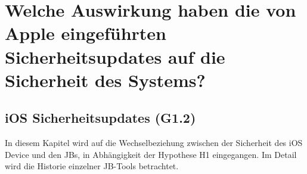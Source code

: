 \section{Welche Auswirkung haben die von Apple eingeführten Sicherheitsupdates auf die Sicherheit des Systems?}
\label{sec:Frage2}
% 

\subsection{iOS Sicherheitsupdates  (G1.2)}
\label{sec:Frage2SecUpdate}

In diesem Kapitel wird auf die Wechselbeziehung zwischen der Sicherheit des iOS Device und den JBs, in Abhängigkeit der Hypothese H1 eingegangen. Im Detail wird die Historie einzelner JB-Tools betrachtet. 

